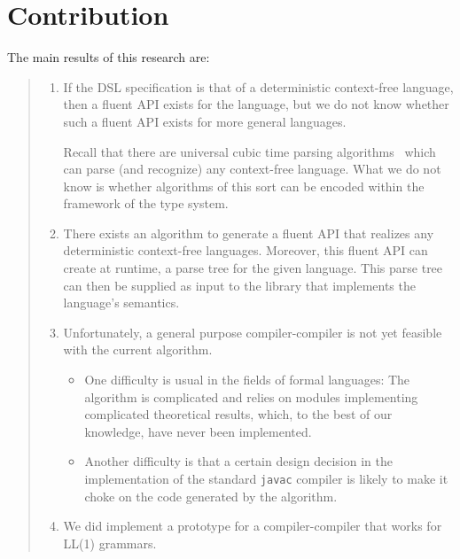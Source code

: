 \section{Contribution}
The main results of this research are:
\begin{quote}
  \begin{enumerate}
  \item If the DSL specification is that of a deterministic context-free
    language, then a fluent API exists for the language, but we do not know
    whether such a fluent API exists for more general languages.
  \par
  Recall that there are universal cubic time parsing
  algorithms~\cite{Cocke:1969,Earley:1970,Younger:1967} which can parse (and recognize) any
  context-free language. What we do not know is whether algorithms of this sort
  can be encoded within the framework of the \Java type system.
  \item
  There exists an algorithm to generate a fluent API that realizes any
  deterministic context-free languages. Moreover, this fluent API can create
  at runtime, a parse tree for the given language. This parse tree can then be
  supplied as input to the library that implements the language's semantics.
    \item
  Unfortunately, a general purpose compiler-compiler
  is not yet feasible with the current algorithm.
  \begin{itemize}
    \item One difficulty is usual in the fields of formal languages:
      The algorithm is complicated and relies on
      modules implementing complicated theoretical results, which, to the best of our
      knowledge, have never been implemented.
    \item Another difficulty is that a certain design decision in the
      implementation of the standard \texttt{javac} compiler is likely to make it choke on the
      \Java code generated by the algorithm.
  \end{itemize}
  \item
    We did implement a prototype for a compiler-compiler that works for LL(1) grammars.
  \end{enumerate}
\end{quote}


